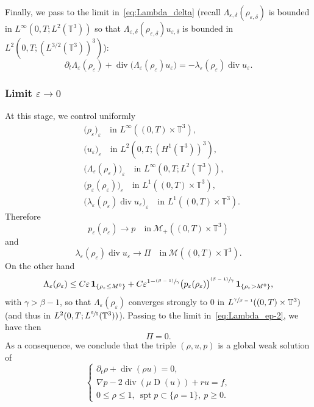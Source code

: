 \documentclass[10pt]{amsart}
\let\mathcal\mathscr
\newcommand{\<}{\bigl\langle}
\renewcommand{\>}{\bigr\rangle}
\newcommand{\psfrac}[2]{\sfrac{(#1)}{#2}}
\DeclareMathOperator{\spt}{spt}
\newcommand{\labeleq}[1]{}
\newenvironment{subnumcasess}{\begin{equation*}\begin{cases}}{\end{cases}\end{equation*}}
\theoremstyle{definition}
\theoremstyle{remark}
\newcommand{\TT}{\mathbb{T}^3}
\DeclareMathOperator{\Div}{div}
\DeclareMathOperator{\D}{D}
\let\ep\varepsilon
\begin{document}
Finally, we pass to the limit in~\eqref{eq:Lambda_delta} (recall $\Lambda_{\ep,\delta}(\rho_{\ep,\delta})$ is bounded in $L^\infty(0,T;L^2(\TT))$ so that $\Lambda_{\ep,\delta}(\rho_{\ep,\delta}) u_{\ep,\delta}$ is bounded in $L^2(0,T;(L^{3/2}(\TT))^3)$):
\begin{equation}\label{eq:Lambda_ep-2}
\partial_t \Lambda_\ep(\rho_\ep) + \Div\big(\Lambda_\ep(\rho_\ep) u_\ep \big) = -\lambda_\ep(\rho_\ep)\Div u_\ep.
\end{equation}

\subsubsection{Limit $\ep \rightarrow 0$}
At this stage, we control uniformly
\begin{align*}
&\big(\rho_\ep \big)_\ep \quad \text{in } L^\infty((0,T)\times \TT), \\
&\big(u_\ep \big)_\ep \quad \text{in } L^2(0,T;(H^1(\TT))^3), \\
&\big(\Lambda_\ep(\rho_\ep)\big)_\ep \quad \text{in } L^\infty(0,T; L^2(\TT)),\\
&\big(p_\ep(\rho_\ep)\big)_\ep \quad \text{in } L^1((0,T)\times \TT),\\
&\big(\lambda_\ep(\rho_\ep) \Div u_\ep\big)_\ep \quad \text{in } L^1((0,T)\times \TT).
\end{align*}
Therefore
\begin{equation*}
p_\ep(\rho_\ep) \to p \quad \text{in}~\mathcal{M}_+((0,T)\times \TT)
\end{equation*}
and
\begin{equation*}
\lambda_\ep(\rho_\ep) \Div u_\ep\to \Pi \quad \text{in}~\mathcal{M}((0,T)\times \TT).
\end{equation*}
On the other hand
\begin{equation*}
\Lambda_\ep(\rho_\ep) \leq C \ep \,\mathbf{1}_{\{\rho_\ep \leq M^0\}}
+ C \ep^{1- \psfrac{\beta-1}{\gamma}} \big(p_\ep(\rho_\ep) \big)^{\psfrac{\beta-1}{\gamma}} \,\mathbf{1}_{\{\rho_\ep > M^0\}},
\end{equation*}
with $\gamma > \beta-1$, so that $\Lambda_\ep(\rho_\ep)$ converges strongly to $0$ in $L^{\sfrac{\gamma}{\beta-1}}((0,T)\times \TT)$ (and thus in $L^2(0,T;L^{\sfrac{6}{5}}(\TT))$).
Passing to the limit in~\eqref{eq:Lambda_ep-2}, we have then
\[
\Pi = 0.
\]
As a consequence, we conclude that the triple $(\rho, u, p)$ is a global weak solution of
\begin{subnumcasess}{\labeleq{xxx3}}
\partial_t \rho + \Div (\rho u) = 0, \\
\nabla p - 2 \Div(\mu \D(u)) + ru = f, \\
0 \leq \rho \leq 1, ~\spt p \subset \{\rho = 1\},~ p \geq 0.
\end{subnumcasess}%
\end{document}
